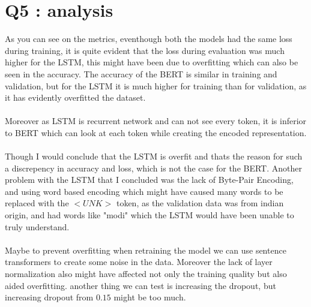 \documentclass[11pt]{article}
\begin{document}
\section {Q5 : analysis}
As you can see on the metrics, eventhough both the models had the same loss during training, it is quite evident that the loss during evaluation was much higher for the LSTM, this might have been due to overfitting which can also be seen in the accuracy. The accuracy of the BERT is similar in training and validation, but for the LSTM it is much higher for training than for validation, as it has evidently overfitted the dataset.
\\\\
Moreover as LSTM is recurrent network and can not see every token, it is inferior to BERT which can look at each token while creating the encoded representation.
\\\\
Though I would conclude that the LSTM is overfit and thats the reason for such a discrepency in accuracy and loss, which is not the case for the BERT. Another problem with the LSTM that I concluded was the lack of Byte-Pair Encoding, and using word based encoding which might have caused many words to be replaced with the $<UNK>$ token, as the validation data was from indian origin, and had words like "modi" which the LSTM would have been unable to truly understand.
\\\\
Maybe to prevent overfitting when retraining the model we can use sentence transformers to create some noise in the data. Moreover the lack of layer normalization also might have affected not only the training quality but also aided overfitting. another thing we can test is increasing the dropout, but increasing dropout from $0.15$ might be too much.
\end{document}

